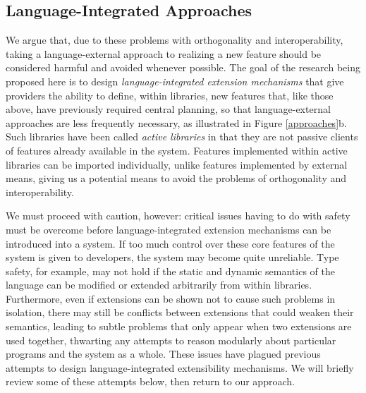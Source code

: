 \subsection{Language-Integrated Approaches}\label{language-integrated-approaches}
We argue that, due to these problems with orthogonality and interoperability, taking a language-external approach to realizing a new feature should be considered harmful and avoided whenever possible. The goal of the research being proposed here is to design \emph{language-integrated extension mechanisms} that give providers the ability to define, within libraries, new features that, like those above, have previously required central planning, 
so that language-external approaches are less frequently necessary, as illustrated in Figure \ref{approaches}b. 
Such libraries have been called \emph{active libraries}  \cite{activelibraries} in that they are not passive clients of features already available in the system.  Features implemented within active libraries can be imported individually, unlike features implemented by external means, giving us a potential means to avoid the problems of orthogonality and interoperability.

We must proceed with caution, however: critical issues having to do with {safety} must be overcome before language-integrated extension mechanisms can be introduced into a system. If too much control over  these core features of the system is given  to developers, the system may become quite unreliable. 
Type safety, for example, may not hold if the static and dynamic semantics of the language can be modified or extended arbitrarily from within libraries. Furthermore, even if extensions can be shown not to cause such problems in isolation, there may still be conflicts between extensions that could weaken their semantics, leading to subtle problems that only appear when two extensions are used together, thwarting any attempts to reason modularly about particular programs and the system as a whole. %
These issues have plagued previous attempts to design language-integrated extensibility mechanisms. We will briefly review some of these attempts below, then return to our approach.%


